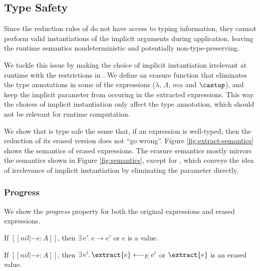 \subsection{Type Safety}
\label{sec:type-safety}

Since the reduction rules of \name do not have access to typing information, they
cannot perform valid instantiations of the implicit arguments during application,
leaving the runtime semantics nondeterministic and potentially non-type-preserving.

We tackle this issue by making the choice of implicit instantiation
irrelevant at runtime with the restrictions in .
We define an erasure function that eliminates the type annotations
in some of the expressions ($\lambda$, $\Lambda$, $mu$ and $\castup$),
and keep the implicit parameter from occuring in the extracted expressions.
This way the choices of implicit instantiation only affect the type annotation,
which should not be relevant for runtime computation.

We show that \name is type safe the sense that,
if an expression is well-typed, then the reduction of its erased version 
does not ``go wrong''. Figure \ref{fig:extract-semantics} shows the semantics of
erased expressions. The erasure semantics mostly mirrors the semantics
shown in Figure \ref{fig:semantics}, except for , which
conveys the idea of irrelevance of implicit instantiation by eliminating the
parameter directly.

\subsubsection{Progress} We show the \emph{progress} property for both the original expressions
and erased expressions.

\begin{theorem}[Progress]
    If $[[nil |- e : A]]$,
    then $\exists \, e'. \, e \longrightarrow e'$ or $e$ is a value.
\end{theorem}

\begin{theorem}
    If $[[nil |- e : A]]$,
    then $\exists \, e'. \, \extract{e} \longleftarrow_E e'$ or $\extract{e}$ is an erased value.
\end{theorem}

